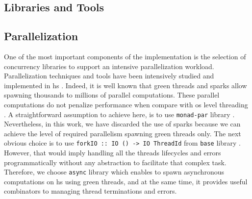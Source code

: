 \subsection{Libraries and Tools}
\subsection{Parallelization} 
One of the most important components of the implementation is the selection of concurrency libraries to support an intensive parallelization workload. Parallelization techniques and tools have been intensively studied and implemented in \acrshort{hs} \cite{monadpar}. 
Indeed, it is well known that green threads and sparks allow spawning thousands to millions of parallel computations. 
These parallel computations do not penalize performance when compare with \acrfull{os} level threading \cite{parallelbook}. 
A straightforward assumption to achieve here, is to use \texttt{monad-par} library \cite{monadparlib, monadpar}. 
Nevertheless, in this work, we have discarded the use of sparks \cite{sparks} because we can achieve the level of required parallelism spawning green threads only.
The next obvious choice is to use \texttt{forkIO :: IO () -> IO ThreadId} from \texttt{base} library \cite{forkio}. 
However, that would imply handling all the threads lifecycles and errors programmatically without any abstraction to facilitate that complex task. 
Therefore, we choose \texttt{async} library \cite{async} which enables to spawn asynchronous computations \cite{parallelbook} on \acrshort{hs} using green threads, and at the same time, it provides useful combinators to managing thread terminations and errors.

